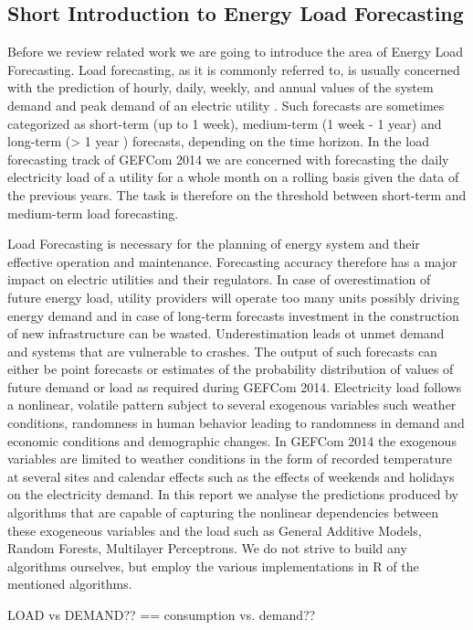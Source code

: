 \documentclass[conference]{IEEEtran}
\begin{document}
\subsection{Short Introduction to Energy Load Forecasting}
Before we review related work we are going to introduce the area of Energy Load Forecasting. Load forecasting, as it is commonly referred to, is usually concerned with the prediction of hourly, daily, weekly, and annual values of the system demand and peak demand of an electric utility \cite{Fan2010}. Such forecasts are sometimes categorized as short-term (up to 1 week), medium-term (1 week - 1 year) and long-term (> 1 year ) forecasts, depending on the time horizon. In the load forecasting track of GEFCom 2014 we are concerned with forecasting the daily electricity load of a utility for a whole month on a rolling basis given the data of the previous years. The task is therefore on the threshold between short-term and medium-term load forecasting.\par
Load Forecasting is necessary for the planning of energy system and their effective operation and maintenance. Forecasting accuracy therefore has a major impact on electric utilities and their regulators. In case of overestimation of future energy load, utility providers will operate too many units possibly driving energy demand and in case of long-term forecasts investment in the construction of new infrastructure can be wasted. Underestimation leads ot unmet demand and systems that are vulnerable to crashes.  
The output of such forecasts can either be point forecasts or estimates of the probability distribution of values of future demand or load as required during GEFCom 2014.
Electricity load follows a nonlinear, volatile pattern subject to several exogenous variables such weather conditions, randomness in human behavior leading to randomness in demand and economic conditions and demographic changes. In GEFCom 2014 the exogenous variables are limited to weather conditions in the form of recorded temperature at several sites and calendar effects such as the effects of weekends and holidays on the electricity demand.
In this report we analyse the predictions produced by algorithms that are capable of capturing the nonlinear dependencies between these exogeneous variables and the load such as General Additive Models, Random Forests, Multilayer Perceptrons. We do not strive to build any algorithms ourselves, but employ the various implementations in R of the mentioned algorithms.

LOAD vs DEMAND?? == consumption vs. demand??
\end{document}
